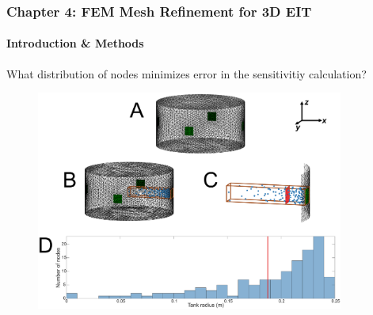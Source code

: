 \documentclass[10pt,    %
    english,            %
    xcolor=table,       %
    envcountsect,        %
    aspectratio=1610
]{beamer}
\begin{document}
\begin{frame}
	\frametitle{Chapter 4: FEM Mesh Refinement for 3D EIT}
	\framesubtitle{Introduction \& Methods}
	What distribution of nodes minimizes error in the sensitivitiy calculation?
	\begin{figure}
		\centering
	\includegraphics[width=0.9\textwidth,trim={0 0cm 0 10cm},clip]{balance_methods.pdf}
	\end{figure}
\end{frame}
\end{document}
